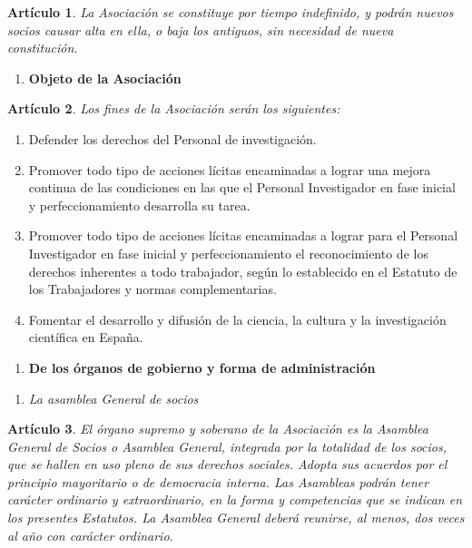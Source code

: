 \documentclass[a4paper,12pt]{article}
\theoremstyle{mystyle}		%
\newtheorem{art}{Artículo}	%
\begin{document}
\begin{onehalfspace}
\begin{art}
La Asociación se constituye por tiempo indefinido, y podrán nuevos socios causar alta en ella, o baja los antiguos, sin necesidad de nueva constitución.
\end{art}

\bigskip

\begin{enumerate}[resume*=capitulo]\centering
 \item \textbf{Objeto de la Asociación}
\end{enumerate}

\begin{art}
Los fines de la Asociación serán los siguientes:
\end{art}
\begin{enumerate}[label={\alph*)}]
 \item Defender los derechos del Personal de investigación.
 \item Promover todo tipo de acciones lícitas encaminadas a lograr una mejora continua de las condiciones en las que el Personal Investigador en fase inicial y perfeccionamiento desarrolla su tarea.
 \item Promover todo tipo de acciones lícitas encaminadas a lograr para el Personal Investigador en fase inicial y perfeccionamiento el reconocimiento de los derechos inherentes a todo trabajador, según lo establecido en el Estatuto de  los Trabajadores y normas complementarias.
 \item Fomentar el desarrollo y difusión de la ciencia, la cultura y la investigación científica en España.
\end{enumerate}

\bigskip

\begin{enumerate}[resume*=capitulo]\centering
 \item \textbf{De los órganos de gobierno y forma de administración}
\end{enumerate}

\begin{enumerate}[label={\it SECCIÓN \arabic*ª.}, labelindent=1\parindent, leftmargin=*, series=seccion]
 \item \textit{La asamblea General de socios}
\end{enumerate}

\begin{art}
El órgano supremo y soberano de la Asociación es la Asamblea General de Socios o Asamblea General, integrada por la totalidad de los socios, que se hallen en uso pleno de sus derechos sociales. Adopta sus acuerdos por el principio mayoritario o de democracia interna. Las Asambleas podrán tener carácter ordinario y extraordinario, en la forma y competencias que se indican en los presentes Estatutos. La Asamblea General deberá reunirse, al menos, dos veces al año con carácter ordinario.
\end{art}


\end{onehalfspace}
\end{document}
